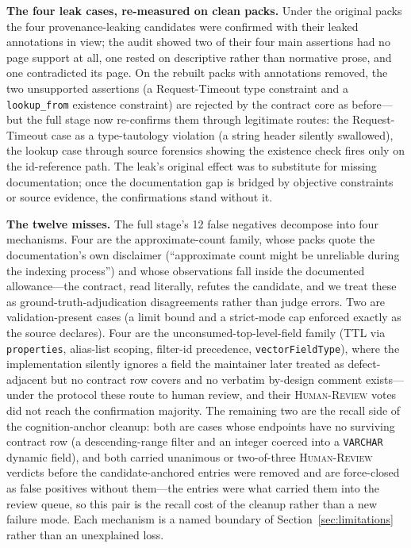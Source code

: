 \documentclass[acmsmall,screen,review,anonymous]{acmart}
\begin{document}
\textbf{The four leak cases, re-measured on clean packs.}
Under the original packs the four provenance-leaking candidates were confirmed with their leaked annotations in view; the audit showed two of their four main assertions had no page support at all, one rested on descriptive rather than normative prose, and one contradicted its page. On the rebuilt packs with annotations removed, the two unsupported assertions (a Request-Timeout type constraint and a \texttt{lookup\_from} existence constraint) are rejected by the contract core as before---but the full stage now re-confirms them through legitimate routes: the Request-Timeout case as a type-tautology violation (a string header silently swallowed), the lookup case through source forensics showing the existence check fires only on the id-reference path. The leak's original effect was to substitute for missing documentation; once the documentation gap is bridged by objective constraints or source evidence, the confirmations stand without it.

\textbf{The twelve misses.}
The full stage's 12 false negatives decompose into four mechanisms. Four are the approximate-count family, whose packs quote the documentation's own disclaimer (``approximate count might be unreliable during the indexing process'') and whose observations fall inside the documented allowance---the contract, read literally, refutes the candidate, and we treat these as ground-truth-adjudication disagreements rather than judge errors. Two are validation-present cases (a limit bound and a strict-mode cap enforced exactly as the source declares). Four are the unconsumed-top-level-field family (TTL via \texttt{properties}, alias-list scoping, filter-id precedence, \texttt{vectorFieldType}), where the implementation silently ignores a field the maintainer later treated as defect-adjacent but no contract row covers and no verbatim by-design comment exists---under the protocol these route to human review, and their \textsc{Human-Review} votes did not reach the confirmation majority. The remaining two are the recall side of the cognition-anchor cleanup: both are cases whose endpoints have no surviving contract row (a descending-range filter and an integer coerced into a \texttt{VARCHAR} dynamic field), and both carried unanimous or two-of-three \textsc{Human-Review} verdicts before the candidate-anchored entries were removed and are force-closed as false positives without them---the entries were what carried them into the review queue, so this pair is the recall cost of the cleanup rather than a new failure mode. Each mechanism is a named boundary of Section~\ref{sec:limitations} rather than an unexplained loss.
\end{document}

